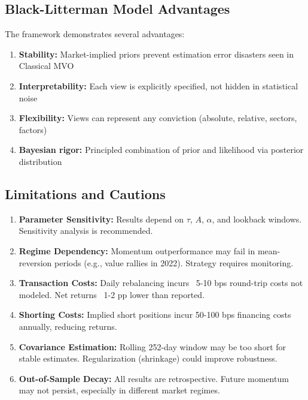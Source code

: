 \documentclass[12pt,a4paper]{article}
\begin{document}
\subsection{Black-Litterman Model Advantages}

The framework demonstrates several advantages:

\begin{enumerate}
\item \textbf{Stability:} Market-implied priors prevent estimation error disasters seen in Classical MVO
\item \textbf{Interpretability:} Each view is explicitly specified, not hidden in statistical noise
\item \textbf{Flexibility:} Views can represent any conviction (absolute, relative, sectors, factors)
\item \textbf{Bayesian rigor:} Principled combination of prior and likelihood via posterior distribution
\end{enumerate}

\subsection{Limitations and Cautions}

\begin{enumerate}
\item \textbf{Parameter Sensitivity:} Results depend on $\tau$, $A$, $\alpha$, and lookback windows. Sensitivity analysis is recommended.

\item \textbf{Regime Dependency:} Momentum outperformance may fail in mean-reversion periods (e.g., value rallies in 2022). Strategy requires monitoring.

\item \textbf{Transaction Costs:} Daily rebalancing incurs ~5-10 bps round-trip costs not modeled. Net returns ~1-2 pp lower than reported.

\item \textbf{Shorting Costs:} Implied short positions incur 50-100 bps financing costs annually, reducing returns.

\item \textbf{Covariance Estimation:} Rolling 252-day window may be too short for stable estimates. Regularization (shrinkage) could improve robustness.

\item \textbf{Out-of-Sample Decay:} All results are retrospective. Future momentum may not persist, especially in different market regimes.
\end{enumerate}
\end{document}
